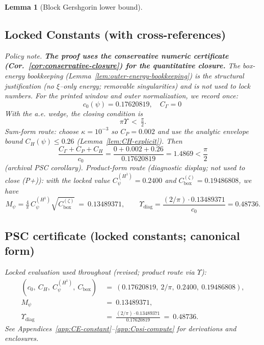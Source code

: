 \documentclass[11pt]{article}
\providecommand{\czeroplateau}{0.17620819}%
\providecommand{\CboxZeta}{K_0 + K_\xi}%
\providecommand{\CpsiHone}{0.2400}%
\providecommand{\Mpsilocked}{(4/\pi)\,\CpsiHone\,\sqrt{\CboxZeta}}
\providecommand{\UpsilonLocked}{(2/\pi)\,\Mpsilocked/\czeroplateau}%
\renewcommand{\CboxZeta}{0.19486808}
\renewcommand{\Mpsilocked}{0.13489371}
\renewcommand{\UpsilonLocked}{0.48736}
\newtheorem{lemma}{Lemma}[section]
\theoremstyle{definition}
\theoremstyle{remark}
\begin{document}
\begin{lemma}[Block Gershgorin lower bound]
\subsection*{Locked Constants (with cross-references)}
\noindent\emph{Policy note.} \textbf{The proof uses the conservative numeric certificate (Cor.~\ref{cor:conservative-closure}) for the quantitative closure.} The box-energy bookkeeping (Lemma~\ref{lem:outer-energy-bookkeeping}) is the structural justification (no $\xi$--only energy; removable singularities) and is not used to lock numbers.
\noindent For the printed window and outer normalization, we record once:
\[
 c_0(\psi)=0.17620819,\quad C_\Gamma=0\ 
\]
With the a.e. wedge, the closing condition is
\[ \pi\Upsilon\ <\ \tfrac{\pi}{2}. \]
Sum-form route: choose \(\kappa=10^{-3}\) so \(C_P=0.002\) and use the analytic envelope bound \(C_H(\psi)\le 0.26\) (Lemma~\ref{lem:CH-explicit}). Then
\[ \frac{C_\Gamma+C_P+C_H}{c_0}=\frac{0+0.002+0.26}{0.17620819}=1.4869<\frac{\pi}{2} \] (archival PSC corollary).
Product-form route (diagnostic display; not used to close (P+)): with the locked value \(C_\psi^{(H^1)}=0.2400\) and \(C_{\mathrm{box}}^{(\zeta)}=\CboxZeta\), we have
\[ M_\psi= \tfrac{4}{\pi}\,C_\psi^{(H^1)}\sqrt{C_{\mathrm{box}}^{(\zeta)}}\ =\ \Mpsilocked,\qquad \Upsilon_{\mathrm{diag}}=\frac{(2/\pi)\cdot \Mpsilocked}{c_0}=\UpsilonLocked.\]






\vspace{1.0cm}
\subsection*{PSC certificate (locked constants; canonical form)}
\noindent\textit{Locked evaluation used throughout (revised; product route via $\Upsilon$):}
\begin{align*}
 (c_0,\ C_H,\ C_\psi^{(H^1)},\ C_{\mathrm{box}})
 &\ =\ (0.17620819,\ 2/\pi,\ 0.2400,\ \CboxZeta),\\
 M_\psi\ &\ =\ \Mpsilocked,\\
 \Upsilon_{\mathrm{diag}}\ &\ =\ \frac{(2/\pi)\cdot \Mpsilocked}{0.17620819}\ =\ \UpsilonLocked. 
\end{align*}
See Appendices~\ref{app:CE-constant}--\ref{app:Cpsi-compute} for derivations and enclosures.





\vspace{1.0cm}

\end{lemma}
\end{document}
